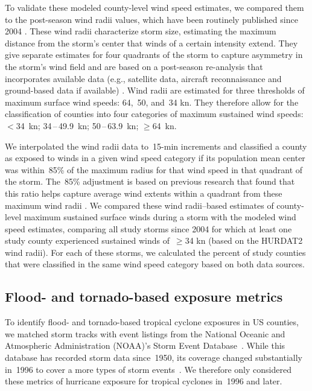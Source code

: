 To validate these modeled county-level wind speed estimates, we compared them
to the  post-season wind radii values, which have been routinely published
since 2004 \parencite{knaff2016using}. These wind radii characterize storm
size, estimating the maximum distance from the storm's center that winds of a
certain intensity extend. They give separate estimates for four quadrants of
the storm to capture asymmetry in the storm's wind field and are 
based on a post-season
re-analysis that incorporates available data (e.g., satellite data, aircraft
reconnaissance and ground-based data if available)
\parencite{knaff2016using}. Wind radii are estimated
for three thresholds of maximum surface wind speeds: 64,~50, and~34 \si{\knot}.
They therefore allow for the classification of counties into four categories of
maximum sustained wind speeds: $<$34~\si{\knot}; 34\,--\,49.9~\si{\knot};
50\,--\,63.9~\si{\knot}; $\ge$64~\si{\knot}. 

We interpolated the wind radii data to~15-\si{\minute} increments and
classified a county as exposed to winds in a given wind speed category if its
population mean center was within~85\% of the maximum radius for that wind
speed in that quadrant of the storm. The~85\% adjustment is based on previous
research that found that this ratio helps capture average wind extents within a
quadrant from these maximum wind radii \parencite{knaff2016using}.  We compared
these wind radii--based estimates of county-level maximum sustained surface
winds during a storm with the modeled wind speed estimates, comparing all study
storms since 2004 for which at least one study county experienced sustained
winds of~$\ge$34 \si{\knot} (based on the \ac{HURDAT2} wind radii). For each of
these storms, we calculated the percent of study counties that were classified
in the same wind speed category based on both data sources.

\subsection*{Flood- and tornado-based exposure metrics}

To identify flood- and tornado-based tropical cyclone exposures in \ac{US}
counties, we matched storm tracks with event listings from the National Oceanic
and Atmospheric Administration (NOAA)'s Storm Event
Database~\parencite{stormevents}. While this database has recorded storm data
since~1950, its coverage changed substantially in~1996 to cover a more types of
storm events~\parencite{stormevents}. We therefore only considered these
metrics of hurricane exposure for tropical cyclones in~1996 and later.

